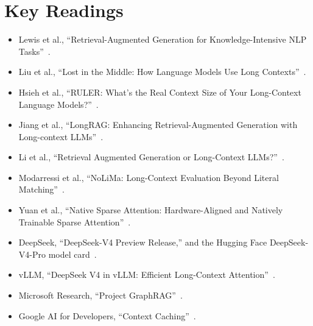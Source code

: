 \section*{Key Readings}

\begin{itemize}
  \item Lewis et al., ``Retrieval-Augmented Generation for Knowledge-Intensive NLP Tasks''~\cite{lewis2020rag}.
  \item Liu et al., ``Lost in the Middle: How Language Models Use Long Contexts''~\cite{liu2023lost}.
  \item Hsieh et al., ``RULER: What's the Real Context Size of Your Long-Context Language Models?''~\cite{hsieh2024ruler}.
  \item Jiang et al., ``LongRAG: Enhancing Retrieval-Augmented Generation with Long-context LLMs''~\cite{jiang2024longrag}.
  \item Li et al., ``Retrieval Augmented Generation or Long-Context LLMs?''~\cite{li2024raglongcontext}.
  \item Modarressi et al., ``NoLiMa: Long-Context Evaluation Beyond Literal Matching''~\cite{modarressi2025nolima}.
  \item Yuan et al., ``Native Sparse Attention: Hardware-Aligned and Natively Trainable Sparse Attention''~\cite{yuan2025nsa}.
  \item DeepSeek, ``DeepSeek-V4 Preview Release,'' and the Hugging Face DeepSeek-V4-Pro model card~\cite{deepseek2026v4release,deepseek2026v4hf}.
  \item vLLM, ``DeepSeek V4 in vLLM: Efficient Long-Context Attention''~\cite{vllm2026deepseekv4}.
  \item Microsoft Research, ``Project GraphRAG''~\cite{microsoft2026graphrag}.
  \item Google AI for Developers, ``Context Caching''~\cite{google2026contextcaching}.
\end{itemize}
